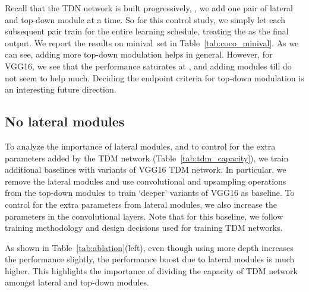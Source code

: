 \documentclass[10pt,twocolumn,letterpaper]{article}
\newcommand{\minival}{minival\raisebox{0.2ex}{}}
\begin{document}
Recall that the TDN network is built progressively, \ie, we add one pair of lateral and top-down module at a time. So for this control study, we simply let each subsequent pair train for the entire learning schedule, treating the  as the final output. We report the results on \minival\ set in Table~\ref{tab:coco_minival}. As we can see, adding more top-down modulation helps in general. However, for VGG16, we see that the performance saturates at , and adding modules till  do not seem to help much. Deciding the endpoint criteria for top-down modulation is an interesting future direction.

\subsection{No lateral modules}
To analyze the importance of lateral modules, and to control for the extra parameters added by the TDM network (Table~\ref{tab:tdm_capacity}), we train additional baselines with variants of VGG16  TDM network. In particular, we remove the lateral modules and use convolutional and upsampling operations from the top-down modules  to train `deeper' variants of VGG16 as baseline. To control for the extra parameters from lateral modules, we also increase the parameters in the convolutional layers. Note that for this baseline, we follow training methodology and design decisions used for training TDM networks. 

As shown in Table~\ref{tab:ablation}(left), even though using more depth increases the performance slightly, the performance boost due to lateral modules is much higher. This highlights the importance of dividing the capacity of TDM network amongst lateral and top-down modules.
\end{document}
